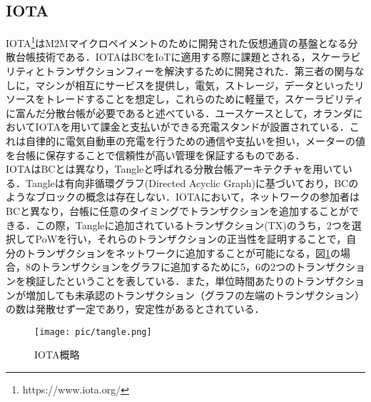 \documentclass[japanese, macos]{KU2}
\begin{document}
\subsection{IOTA}
IOTA\footnote{https://www.iota.org/}はM2Mマイクロペイメントのために開発された仮想通貨の基盤となる分散台帳技術である．IOTAはBCをIoTに適用する際に課題とされる，スケーラビリティとトランザクションフィーを解決するために開発された．第三者の関与なしに，マシンが相互にサービスを提供し，電気，ストレージ，データといったリソースをトレードすることを想定し，これらのために軽量で，スケーラビリティに富んだ分散台帳が必要であると述べている．ユースケースとして，オランダにおいてIOTAを用いて課金と支払いができる充電スタンドが設置されている．これは自律的に電気自動車の充電を行うための通信や支払いを担い，メーターの値を台帳に保存することで信頼性が高い管理を保証するものである．\\
IOTAはBCとは異なり，Tangleと呼ばれる分散台帳アーキテクチャを用いている．Tangleは有向非循環グラフ(Directed Acyclic Graph)に基づいており，BCのようなブロックの概念は存在しない．IOTAにおいて，ネットワークの参加者はBCと異なり，台帳に任意のタイミングでトランザクションを追加することができる．この際，Tangleに追加されているトランザクション(TX)のうち，2つを選択してPoWを行い，それらのトランザクションの正当性を証明することで，自分のトランザクションをネットワークに追加することが可能になる，図\ref{fig:IOTA}の場合，8のトランザクションをグラフに追加するために5，6の2つのトランザクションを検証したということを表している．また，単位時間あたりのトランザクションが増加しても未承認のトランザクション（グラフの左端のトランザクション）の数は発散せず一定であり，安定性があるとされている\cite{kusmierz2017first}．\\

\begin{figure}[htbp]
  \begin{center} 
    \texttt{[image: pic/tangle.png]}
    \caption{IOTA概略}
    \label{fig:IOTA} 
  \end{center}
\end{figure}
\end{document}
